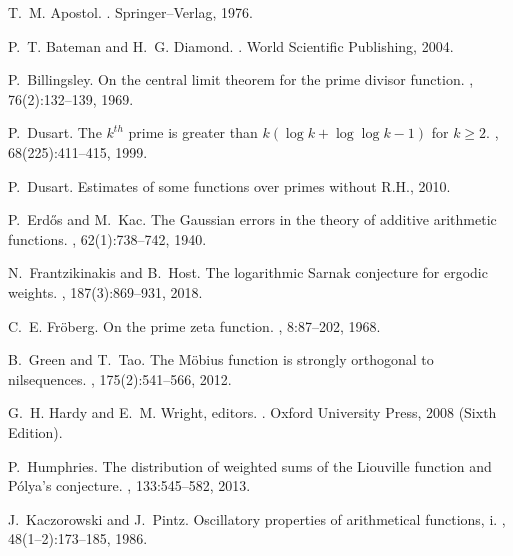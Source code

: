 \documentclass[11pt,reqno,a4letter]{article}
\numberwithin{equation}{section}
\numberwithin{figure}{section}
\numberwithin{table}{section}
\theoremstyle{plain}
\numberwithin{theorem}{section}
\theoremstyle{definition}
\begin{document}
\begin{thebibliography}{10}

T.~M. Apostol.
.
\newblock Springer--Verlag, 1976.

P.~T. Bateman and H.~G. Diamond.
.
\newblock World Scientific Publishing, 2004.

P.~Billingsley.
\newblock On the central limit theorem for the prime divisor function.
, 76(2):132--139, 1969.

P.~Dusart.
\newblock The $k^{th}$ prime is greater than $k(\log k +\log\log k-1)$ for $k
  \geq 2$.
, 68(225):411--415, 1999.

P.~Dusart.
\newblock Estimates of some functions over primes without {R}.{H}., 2010.

P.~Erd{\H{o}}s and M.~Kac.
\newblock The {G}aussian errors in the theory of additive arithmetic functions.
, 62(1):738--742, 1940.

N.~Frantzikinakis and B.~Host.
\newblock The logarithmic {S}arnak conjecture for ergodic weights.
, 187(3):869--931, 2018.

C.~E. Fr{\"{o}}berg.
\newblock On the prime zeta function.
, 8:87--202, 1968.

B.~Green and T.~Tao.
\newblock The {M}\"{o}bius function is strongly orthogonal to nilsequences.
, 175(2):541--566, 2012.

G.~H. Hardy and E.~M. Wright, editors.
.
\newblock Oxford University Press, 2008 (Sixth Edition).

P.~Humphries.
\newblock The distribution of weighted sums of the {L}iouville function and
  {P}\'{o}lya's conjecture.
, 133:545--582, 2013.

J.~Kaczorowski and J.~Pintz.
\newblock Oscillatory properties of arithmetical functions, i.
, 48(1--2):173--185, 1986.


\end{thebibliography}
\end{document}
